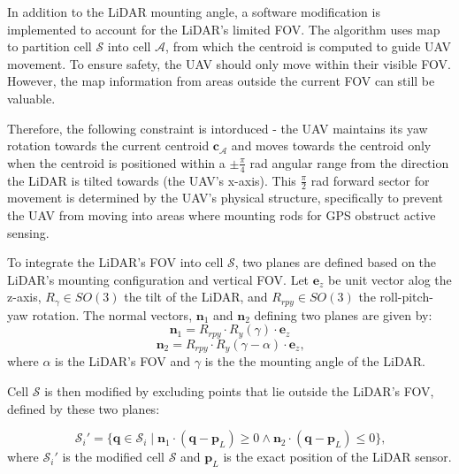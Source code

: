             In addition to the \ac{LiDAR} mounting angle, a software modification is implemented to account for the \ac{LiDAR}'s limited \ac{FOV}.
            The algorithm uses map to partition cell $\mathcal{S}$ into cell $\mathcal{A}$, from which the centroid is computed to guide \ac{UAV} movement.
            To ensure safety, the \ac{UAV} should only move within their visible \ac{FOV}. 
            However, the map information from areas outside the current \ac{FOV} can still be valuable. 

            Therefore, the following constraint is intorduced - the \ac{UAV} maintains its yaw rotation towards the current centroid $\mathbf{c}_{\mathcal{A}}$ and moves towards the centroid only when the centroid is positioned within a $\pm \frac{\pi}{4}$ rad angular range from the direction the \ac{LiDAR} is tilted towards (the \ac{UAV}'s x-axis).
            This $\frac{\pi}{2}$ rad forward sector for movement is determined by the \ac{UAV}'s physical structure, specifically to prevent the \ac{UAV} from moving into areas where mounting rods for GPS obstruct active sensing.

            To integrate the \ac{LiDAR}'s \ac{FOV} into cell $\mathcal{S}$, two planes are defined based on the \ac{LiDAR}'s mounting configuration and vertical \ac{FOV}.
            Let $\mathbf{e}_z$ be unit vector alog the z-axis, $R_{\gamma} \in SO(3)$ the tilt of the \ac{LiDAR}, and $R_{rpy} \in SO(3)$ the roll-pitch-yaw rotation.
            The normal vectors, $\mathbf{n}_1$ and $\mathbf{n}_2$ defining two planes are given by:
            \begin{equation}
                \mathbf{n}_1 = R_{rpy} \cdot R_{y}(\gamma) \cdot \mathbf{e}_z    
            \end{equation}
            \begin{equation}
                \mathbf{n}_2 = R_{rpy} \cdot R_{y}(\gamma - \alpha) \cdot \mathbf{e}_z  \text{,}
            \end{equation}
            where $\alpha$ is the \ac{LiDAR}'s \ac{FOV} and $\gamma$ is the the mounting angle of the \ac{LiDAR}.

            Cell $\mathcal{S}$ is then modified by excluding points that lie outside the \ac{LiDAR}'s \ac{FOV}, defined by these two planes: 

            \begin{equation}
                \mathcal{S}_i' = \{ \mathbf{q} \in \mathcal{S}_i \mid \mathbf{n}_1 \cdot (\mathbf{q} - \mathbf{p}_{L}) \geq 0 \land \mathbf{n}_2 \cdot (\mathbf{q} - \mathbf{p}_{L}) \leq 0 \}\text{,}
            \end{equation}
            where $\mathcal{S}_i'$ is the modified cell $\mathcal{S}$ and $\mathbf{p}_{L}$ is the exact position of the LiDAR sensor.

